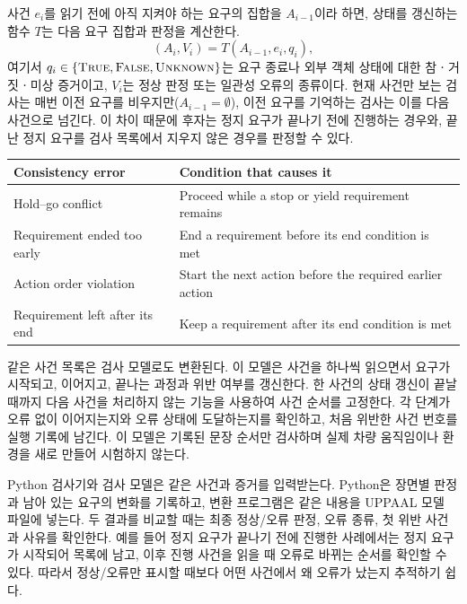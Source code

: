 사건 $e_i$를 읽기 전에 아직 지켜야 하는 요구의 집합을 $A_{i-1}$이라 하면, 상태를 갱신하는 함수 $T$는 다음 요구 집합과 판정을 계산한다.
\begin{equation}
(A_i,V_i)=T(A_{i-1},e_i,q_i),
\label{eq:state-transition}
\end{equation}
여기서 $q_i\in\{\textsc{True},\textsc{False},\textsc{Unknown}\}$는 요구 종료나 외부 객체 상태에 대한 참ㆍ거짓ㆍ미상 증거이고, $V_i$는 정상 판정 또는 일관성 오류의 종류이다. 현재 사건만 보는 검사는 매번 이전 요구를 비우지만($A_{i-1}=\emptyset$), 이전 요구를 기억하는 검사는 이를 다음 사건으로 넘긴다. 이 차이 때문에 후자는 정지 요구가 끝나기 전에 진행하는 경우와, 끝난 정지 요구를 검사 목록에서 지우지 않은 경우를 판정할 수 있다.

\begin{table}[t]
\centering
{}
\label{tab:contradiction-semantics}
\footnotesize
\begin{tabularx}{\columnwidth}{L{0.44\columnwidth}Y}
\toprule
Consistency error & Condition that causes it \\
\midrule
Hold--go conflict & Proceed while a stop or yield requirement remains \\
Requirement ended too early & End a requirement before its end condition is met \\
Action order violation & Start the next action before the required earlier action \\
Requirement left after its end & Keep a requirement after its end condition is met \\
\bottomrule
\end{tabularx}
\end{table}

같은 사건 목록은 \uppaal 검사 모델로도 변환된다. 이 모델은 사건을 하나씩 읽으면서 요구가 시작되고, 이어지고, 끝나는 과정과 위반 여부를 갱신한다. 한 사건의 상태 갱신이 끝날 때까지 다음 사건을 처리하지 않는 \uppaal{} 기능을 사용하여 사건 순서를 고정한다. 각 단계가 오류 없이 이어지는지와 오류 상태에 도달하는지를 확인하고, 처음 위반한 사건 번호를 실행 기록에 남긴다. 이 모델은 기록된 문장 순서만 검사하며 실제 차량 움직임이나 환경을 새로 만들어 시험하지 않는다.

Python 검사기와 \uppaal 검사 모델은 같은 사건과 증거를 입력받는다. Python은 장면별 판정과 남아 있는 요구의 변화를 기록하고, 변환 프로그램은 같은 내용을 UPPAAL 모델 파일에 넣는다. 두 결과를 비교할 때는 최종 정상/오류 판정, 오류 종류, 첫 위반 사건과 {\unknown} 사유를 확인한다. 예를 들어 정지 요구가 끝나기 전에 진행한 사례에서는 정지 요구가 시작되어 목록에 남고, 이후 진행 사건을 읽을 때 오류로 바뀌는 순서를 확인할 수 있다. 따라서 정상/오류만 표시할 때보다 어떤 사건에서 왜 오류가 났는지 추적하기 쉽다.

